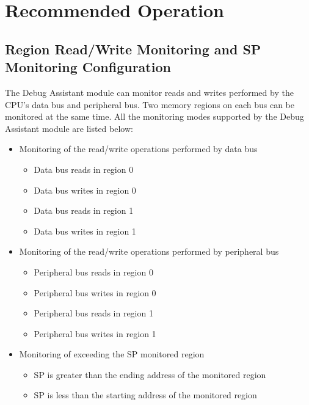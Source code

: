 \documentclass[main\_\_EN.tex]{subfiles}
\begin{document}
\section{Recommended Operation}
\label{sec:dbgassist-recommended-operation}

\subsection{Region Read/Write Monitoring and SP Monitoring Configuration}

The Debug Assistant module can monitor reads and writes performed by the CPU's data bus and peripheral bus. Two memory regions on each bus can be monitored at the same time. All the monitoring modes supported by the Debug Assistant module are listed below:
\begin{itemize}
    \item Monitoring of the read/write operations performed by data bus
        \begin{itemize}
            \item Data bus reads in region 0
            \item Data bus writes in region 0
            \item Data bus reads in region 1
            \item Data bus writes in region 1
        \end{itemize}    
    \item Monitoring of the read/write operations performed by peripheral bus
        \begin{itemize}
            \item Peripheral bus reads in region 0
            \item Peripheral bus writes in region 0
            \item Peripheral bus reads in region 1
            \item Peripheral bus writes in region 1
        \end{itemize}
    \item  Monitoring of exceeding the SP monitored region
        \begin{itemize}
            \item SP is greater than the ending address of the monitored region
            \item SP is less than the starting address of the monitored region
        \end{itemize}
\end{itemize}
\end{document}

